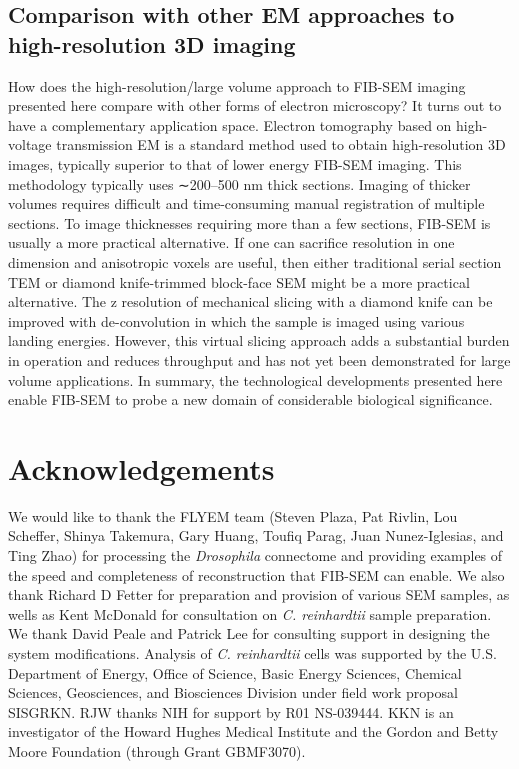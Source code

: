 \documentclass{article}
\begin{document}
\subsection*{Comparison with other EM approaches to high-resolution 3D imaging}

How does the high-resolution/large volume approach to FIB-SEM imaging presented here compare with other forms of electron microscopy? It turns out to have a complementary application space. Electron tomography based on high-voltage transmission EM is a standard method used to obtain high-resolution 3D images, typically superior to that of lower energy FIB-SEM imaging. This methodology typically uses ∼200–500 nm thick sections. Imaging of thicker volumes requires difficult and time-consuming manual registration of multiple sections. To image thicknesses requiring more than a few sections, FIB-SEM is usually a more practical alternative. If one can sacrifice resolution in one dimension and anisotropic voxels are useful, then either traditional serial section TEM or diamond knife-trimmed block-face SEM might be a more practical alternative. The z resolution of mechanical slicing with a diamond knife can be improved with de-convolution in which the sample is imaged using various landing energies. However, this virtual slicing approach adds a substantial burden in operation and reduces throughput and has not yet been demonstrated for large volume applications. In summary, the technological developments presented here enable FIB-SEM to probe a new domain of considerable biological significance.

\section*{Acknowledgements}

We would like to thank the FLYEM team (Steven Plaza, Pat Rivlin, Lou Scheffer, Shinya Takemura, Gary Huang, Toufiq Parag, Juan Nunez-Iglesias, and Ting Zhao) for processing the \emph{Drosophila} connectome and providing examples of the speed and completeness of reconstruction that FIB-SEM can enable. We also thank Richard D Fetter for preparation and provision of various SEM samples, as wells as Kent McDonald for consultation on \emph{C. reinhardtii} sample preparation. We thank David Peale and Patrick Lee for consulting support in designing the system modifications. Analysis of \emph{C. reinhardtii} cells was supported by the U.S. Department of Energy, Office of Science, Basic Energy Sciences, Chemical Sciences, Geosciences, and Biosciences Division under field work proposal SISGRKN. RJW thanks NIH for support by R01 NS-039444. KKN is an investigator of the Howard Hughes Medical Institute and the Gordon and Betty Moore Foundation (through Grant GBMF3070).
\end{document}
